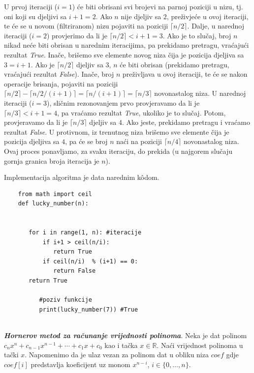  \begin{solution}
U prvoj iteraciji ($i=1$) će biti obrisani svi brojevi na parnoj poziciji u nizu, tj. oni koji su djeljivi sa $i+1=2$. Ako $n$ nije djeljiv sa $2$, preživjeće u ovoj iteraciji, te će se u novom (filtriranom) nizu pojaviti na poziciji $\lceil n/2 \rceil$. Dalje, u narednoj iteraciji ($i=2$) provjerimo da li je $\lceil n/2 \rceil < i+1=3$. Ako je to slučaj, broj $n$ nikad neće biti obrisan u narednim iteracijima, pa prekidamo pretragu, vraćajući rezultat \emph{True}. Inače, brišemo sve elemente novog niza čija je pozicija djeljiva sa $3=i+1$. Ako je $\lceil n/2 \rceil$ djeljiv sa 3, $n$ će biti obrisan (prekidamo pretragu, vraćajući rezultat \emph{False}). Inače, broj $n$ preživljava u ovoj iteraciji, te će se nakon operacije brisanja, pojaviti na poziciji $\lceil n/2 \rceil - \lceil n/2 /(i+1)\rceil = \lceil n/(i+1) \rceil = \lceil n/3 \rceil$ novonastalog niza. U narednoj iteraciji ($i=3$), sličnim rezonovanjem prvo provjeravamo da li je $\lceil n/3 \rceil < i+1=4$, pa vraćamo rezultat \emph{True}, ukoliko je to slučaj. Potom, provjeravamo da li je
 $\lceil n/3 \rceil$ djeljiv sa 4. Ako jeste, prekidamo pretragu i vraćamo rezultat \emph{False}. U protivnom, iz trenutnog niza brišemo sve elemente čija je pozicija djeljiva sa $4$, pa će se broj $n$ naći na poziciji $\lceil n/4 \rceil$ novonastalog niza. Ovaj proces ponavljamo, za svaku iteraciju, do prekida (u najgorem slučaju gornja granica broja iteracija je $n$).  
 
 
 Implementacija algoritma je data narednim k\^odom. 
 
 \begin{verbatim}
 	from math import ceil
 	def lucky_number(n):
 
 	      
 	   for i in range(1, n): #iteracije
 	       if i+1 > ceil(n/i):
 	          return True 
 	       if ceil(n/i)  % (i+1) == 0:
 	          return False
 	   return True       
    
          #poziv funkcije
          print(lucky_number(7)) #True	       
  
 \end{verbatim}
  
 \end{solution}
 
\begin{definition}
	\textbf{\textit{Hornerov metod za računanje vrijednosti polinoma}}. Neka je dat polinom $c_n x^n + c_{n-1}x^{n-1} + \cdots + c_1 x + c_0$ kao i tačka $x \in \mathbb{R}$. Naći vrijednost polinoma u tački $x$. Napomenimo da je ulaz vezan za polinom dat u obliku niza $ coef$ gdje   $coef[i]$ predstavlja koeficijent uz monom  $x^{n-i}$, $i \in \{0, \ldots, n\}$. 

\end{definition}

